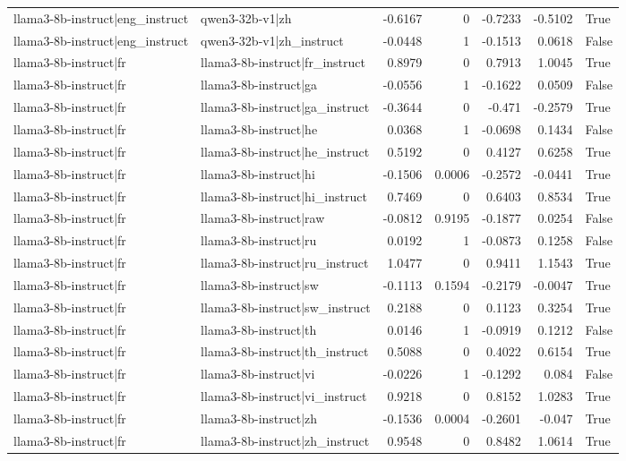 \begin{table}
\begin{tabular}{l l r r r r l}
llama3-8b-instruct|eng_instruct & qwen3-32b-v1|zh & -0.6167 & 0 & -0.7233 & -0.5102 & True \\
llama3-8b-instruct|eng_instruct & qwen3-32b-v1|zh_instruct & -0.0448 & 1 & -0.1513 & 0.0618 & False \\
llama3-8b-instruct|fr & llama3-8b-instruct|fr_instruct & 0.8979 & 0 & 0.7913 & 1.0045 & True \\
llama3-8b-instruct|fr & llama3-8b-instruct|ga & -0.0556 & 1 & -0.1622 & 0.0509 & False \\
llama3-8b-instruct|fr & llama3-8b-instruct|ga_instruct & -0.3644 & 0 & -0.471 & -0.2579 & True \\
llama3-8b-instruct|fr & llama3-8b-instruct|he & 0.0368 & 1 & -0.0698 & 0.1434 & False \\
llama3-8b-instruct|fr & llama3-8b-instruct|he_instruct & 0.5192 & 0 & 0.4127 & 0.6258 & True \\
llama3-8b-instruct|fr & llama3-8b-instruct|hi & -0.1506 & 0.0006 & -0.2572 & -0.0441 & True \\
llama3-8b-instruct|fr & llama3-8b-instruct|hi_instruct & 0.7469 & 0 & 0.6403 & 0.8534 & True \\
llama3-8b-instruct|fr & llama3-8b-instruct|raw & -0.0812 & 0.9195 & -0.1877 & 0.0254 & False \\
llama3-8b-instruct|fr & llama3-8b-instruct|ru & 0.0192 & 1 & -0.0873 & 0.1258 & False \\
llama3-8b-instruct|fr & llama3-8b-instruct|ru_instruct & 1.0477 & 0 & 0.9411 & 1.1543 & True \\
llama3-8b-instruct|fr & llama3-8b-instruct|sw & -0.1113 & 0.1594 & -0.2179 & -0.0047 & True \\
llama3-8b-instruct|fr & llama3-8b-instruct|sw_instruct & 0.2188 & 0 & 0.1123 & 0.3254 & True \\
llama3-8b-instruct|fr & llama3-8b-instruct|th & 0.0146 & 1 & -0.0919 & 0.1212 & False \\
llama3-8b-instruct|fr & llama3-8b-instruct|th_instruct & 0.5088 & 0 & 0.4022 & 0.6154 & True \\
llama3-8b-instruct|fr & llama3-8b-instruct|vi & -0.0226 & 1 & -0.1292 & 0.084 & False \\
llama3-8b-instruct|fr & llama3-8b-instruct|vi_instruct & 0.9218 & 0 & 0.8152 & 1.0283 & True \\
llama3-8b-instruct|fr & llama3-8b-instruct|zh & -0.1536 & 0.0004 & -0.2601 & -0.047 & True \\
llama3-8b-instruct|fr & llama3-8b-instruct|zh_instruct & 0.9548 & 0 & 0.8482 & 1.0614 & True \\

\end{tabular}
\end{table}
